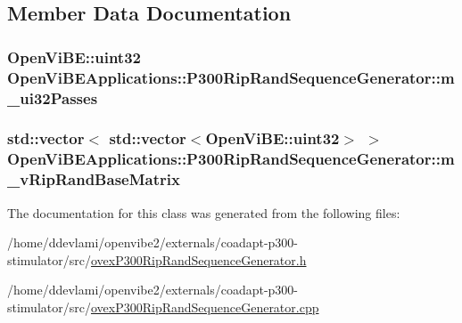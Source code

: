 \subsection{Member Data Documentation}
\hypertarget{classOpenViBEApplications_1_1P300RipRandSequenceGenerator_a07051ef0560fc28e1defbf93841e9a1b}{
\subsubsection[{m\_\-ui32Passes}]{\setlength{\rightskip}{0pt plus 5cm}OpenViBE::uint32 {\bf OpenViBEApplications::P300RipRandSequenceGenerator::m\_\-ui32Passes}}}
\label{classOpenViBEApplications_1_1P300RipRandSequenceGenerator_a07051ef0560fc28e1defbf93841e9a1b}
\hypertarget{classOpenViBEApplications_1_1P300RipRandSequenceGenerator_a1fd9f9c27224a28f11cff0d8d391e07c}{
\subsubsection[{m\_\-vRipRandBaseMatrix}]{\setlength{\rightskip}{0pt plus 5cm}std::vector$<$ std::vector$<$OpenViBE::uint32$>$ $>$ {\bf OpenViBEApplications::P300RipRandSequenceGenerator::m\_\-vRipRandBaseMatrix}}}
\label{classOpenViBEApplications_1_1P300RipRandSequenceGenerator_a1fd9f9c27224a28f11cff0d8d391e07c}


The documentation for this class was generated from the following files:\begin{DoxyCompactItemize}
\item 
/home/ddevlami/openvibe2/externals/coadapt-\/p300-\/stimulator/src/\hyperlink{ovexP300RipRandSequenceGenerator_8h}{ovexP300RipRandSequenceGenerator.h}\item 
/home/ddevlami/openvibe2/externals/coadapt-\/p300-\/stimulator/src/\hyperlink{ovexP300RipRandSequenceGenerator_8cpp}{ovexP300RipRandSequenceGenerator.cpp}\end{DoxyCompactItemize}
